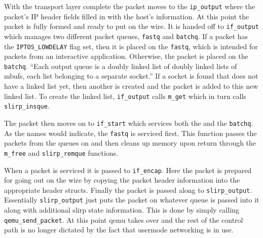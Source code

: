With the transport layer complete the packet moves to the \texttt{ip_output} where the packet's IP header fields filled in with the host's information.
At this point the packet is fully formed and ready to put on the wire.
It is handed off to \texttt{if_output} which manages two different packet queues, \texttt{fastq} and \texttt{batchq}.
If a packet has the \texttt{IPTOS_LOWDELAY} flag set, then it is placed on the \texttt{fastq}, which is intended for packets from an interactive application.
Otherwise, the packet is placed on the \texttt{batchq}.
``Each output queue is a doubly linked list of doubly linked lists of mbufs, each list belonging to a separate socket.''
If a socket is found that does not have a linked list yet, then another is created and the packet is added to this new linked list.
To create the linked list, \texttt{if_output} calls \texttt{m_get} which in turn calls \texttt{slirp_insque}.

The packet then moves on to \texttt{if_start} which services both the  and the \texttt{batchq}.
As the names would indicate, the \texttt{fastq} is serviced first.
This function passes the packets from the queues on and then cleans up memory upon return through the \texttt{m_free} and \texttt{slirp_remque} functions.

When a packet is serviced it is passed to \texttt{if_encap}.
Here the packet is prepared for going out on the wire by copying the packet header information into the appropriate header structs.
Finally the packet is passed along to \texttt{slirp_output}. 
Essentially \texttt{slirp_output} just puts the packet on whatever queue is passed into it along with additional slirp state information.
This is done by simply calling \texttt{qemu_send_packet}.
At this point qemu takes over and the rest of the control path is no longer dictated by the fact that usermode networking is in use.

